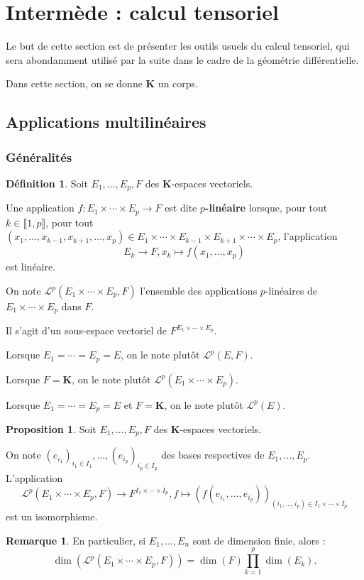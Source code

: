 \documentclass[12pt,a4paper]{article}
\theoremstyle{definition}
\newtheorem{prop}[thm]{Proposition}
\newtheorem{defn}[thm]{Définition}
\newtheorem{rqe}[thm]{Remarque}
\begin{document}
\section{Intermède : calcul tensoriel}
Le but de cette section est de présenter les outils usuels du calcul tensoriel, qui sera abondamment utilisé par la suite dans le cadre de la géométrie différentielle.

Dans cette section, on se donne $\mathbf{K}$ un corps.
\subsection{Applications multilinéaires}
\subsubsection{Généralités}
\begin{defn}
Soit $E_1,\ldots,E_p,F$ des $\mathbf{K}$-espaces vectoriels.

Une application $f:E_1\times\cdots\times E_p\to F$ est dite \textbf{$p$-linéaire} lorsque, pour tout $k\in\llbracket 1,p\rrbracket$, pour tout $(x_1,\ldots,x_{k-1},x_{k+1},\ldots,x_p)\in E_1\times\cdots\times E_{k-1}\times E_{k+1}\times\cdots\times E_p$, l'application
$$E_k\to F, x_k\mapsto f(x_1,\ldots,x_p)$$
est linéaire.

On note $\mathcal{L}^p(E_1\times\cdots\times E_p,F)$ l'ensemble des applications $p$-linéaires de $E_1\times\cdots\times E_p$ dans $F$.

Il s'agit d'un sous-espace vectoriel de $F^{E_1\times\cdots\times E_p}$.

Lorsque $E_1=\cdots=E_p=E$, on le note plutôt $\mathcal{L}^p(E,F)$.

Lorsque $F=\mathbf{K}$, on le note plutôt $\mathcal{L}^p(E_1\times\cdots\times E_p)$.

Lorsque $E_1=\cdots=E_p=E$ et $F=\mathbf{K}$, on le note plutôt $\mathcal{L}^p(E)$.
\end{defn}
\begin{prop}
Soit $E_1,\ldots, E_p,F$ des $\mathbf{K}$-espaces vectoriels.

On note $(e_{i_1})_{i_1\in I_1},\ldots,(e_{i_p})_{i_p\in I_p}$ des bases respectives de $E_1,\ldots,E_p$. L'application 
$$
\mathcal{L}^p(E_1\times\cdots\times E_p,F)\to F^{I_1\times\cdots\times I_p},f\mapsto \left(f\left(e_{i_1},\ldots,e_{i_p}\right)\right)_{(i_1,\ldots,i_p)\in I_1\times\cdots\times I_p}
$$
est un isomorphisme.
\end{prop}
\begin{rqe}
En particulier, si $E_1,\ldots,E_n$ sont de dimension finie, alors :
$$\dim\left(\mathcal{L}^p(E_1\times\cdots\times E_p,F)\right)=\dim(F)\prod\limits_{k=1}^p\dim(E_k).$$
\end{rqe}
\newpage
\end{document}
